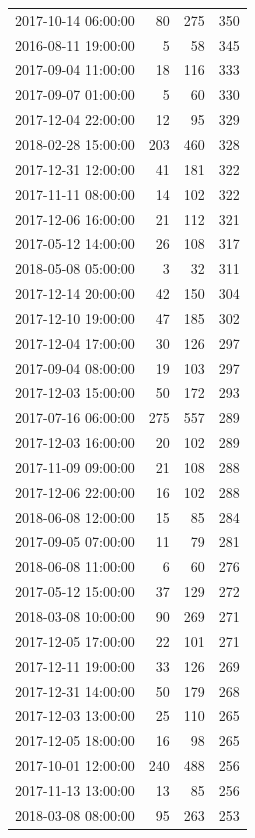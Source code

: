 \begin{tabular}{lrrr}
2017-10-14 06:00:00 & 80 & 275 & 350 \\
2016-08-11 19:00:00 & 5 & 58 & 345 \\
2017-09-04 11:00:00 & 18 & 116 & 333 \\
2017-09-07 01:00:00 & 5 & 60 & 330 \\
2017-12-04 22:00:00 & 12 & 95 & 329 \\
2018-02-28 15:00:00 & 203 & 460 & 328 \\
2017-12-31 12:00:00 & 41 & 181 & 322 \\
2017-11-11 08:00:00 & 14 & 102 & 322 \\
2017-12-06 16:00:00 & 21 & 112 & 321 \\
2017-05-12 14:00:00 & 26 & 108 & 317 \\
2018-05-08 05:00:00 & 3 & 32 & 311 \\
2017-12-14 20:00:00 & 42 & 150 & 304 \\
2017-12-10 19:00:00 & 47 & 185 & 302 \\
2017-12-04 17:00:00 & 30 & 126 & 297 \\
2017-09-04 08:00:00 & 19 & 103 & 297 \\
2017-12-03 15:00:00 & 50 & 172 & 293 \\
2017-07-16 06:00:00 & 275 & 557 & 289 \\
2017-12-03 16:00:00 & 20 & 102 & 289 \\
2017-11-09 09:00:00 & 21 & 108 & 288 \\
2017-12-06 22:00:00 & 16 & 102 & 288 \\
2018-06-08 12:00:00 & 15 & 85 & 284 \\
2017-09-05 07:00:00 & 11 & 79 & 281 \\
2018-06-08 11:00:00 & 6 & 60 & 276 \\
2017-05-12 15:00:00 & 37 & 129 & 272 \\
2018-03-08 10:00:00 & 90 & 269 & 271 \\
2017-12-05 17:00:00 & 22 & 101 & 271 \\
2017-12-11 19:00:00 & 33 & 126 & 269 \\
2017-12-31 14:00:00 & 50 & 179 & 268 \\
2017-12-03 13:00:00 & 25 & 110 & 265 \\
2017-12-05 18:00:00 & 16 & 98 & 265 \\
2017-10-01 12:00:00 & 240 & 488 & 256 \\
2017-11-13 13:00:00 & 13 & 85 & 256 \\
2018-03-08 08:00:00 & 95 & 263 & 253 \\

\end{tabular}
